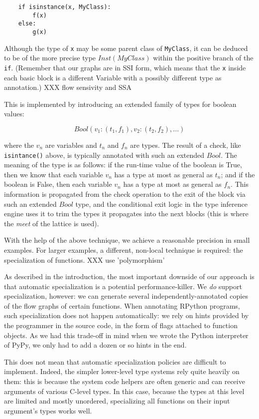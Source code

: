 \documentclass{acm_proc_article-sp}
\begin{document}
\begin{verbatim}
    if isinstance(x, MyClass):
        f(x)
    else:
        g(x)
\end{verbatim}

Although the type of \texttt{x} may be some parent class of
\texttt{MyClass}, it can be deduced to be of the more precise type
$Inst(MyClass)$ within the positive branch of the \texttt{if}.
(Remember that our graphs are in SSI form, which means that the
\texttt{x} inside each basic block is a different Variable with a
possibly different type as annotation.) XXX flow sensivity and SSA

This is implemented by introducing an extended family of types for
boolean values:

$$
Bool(v_1: (t_1, f_1), v_2: (t_2, f_2), ...)
$$

where the $v_n$ are variables and $t_n$ and $f_n$ are types.  The
result of a check, like \texttt{isintance()} above, is typically
annotated with such an extended $Bool$.  The meaning of the type is as
follows: if the run-time value of the boolean is True, then we know
that each variable $v_n$ has a type at most as general as $t_n$; and
if the boolean is False, then each variable $v_n$ has a type at most
as general as $f_n$.  This information is propagated from the check
operation to the exit of the block via such an extended $Bool$ type,
and the conditional exit logic in the type inference engine uses it to
trim the types it propagates into the next blocks (this is where the
\textit{meet} of the lattice is used).

With the help of the above technique, we achieve a reasonable precision
in small examples.  For larger examples, a different, non-local
technique is required: the specialization of functions. XXX use 'polymorphism'

As described in the introduction, the most important downside of our
approach is that automatic specialization is a potential
performance-killer.  We \textit{do} support specialization, however: we can
generate several independently-annotated copies of the flow graphs of
certain functions.  When annotating RPython programs, such
specialization does not happen automatically: we rely on hints provided
by the programmer in the source code, in the form of flags attached to
function objects.  As we had this trade-off in mind when we wrote the
Python interpreter of PyPy, we only had to add a dozen or so hints in
the end.

This does not mean that automatic specialization policies are difficult
to implement.  Indeed, the simpler lower-level type systems rely quite
heavily on them: this is because the system code helpers are often
generic and can receive arguments of various C-level types.  In this
case, because the types at this level are limited and mostly unordered,
specializing all functions on their input argument's types works well.
\end{document}

